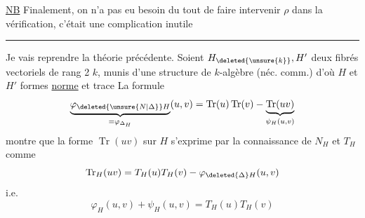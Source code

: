 \uline{NB} Finalement, on n'a pas eu besoin du tout de faire intervenir $\rho$ dans la vérification, c'était une complication inutile

\begin{center}\rule{3cm}{0.4pt}\end{center}

Je vais reprendre la théorie précédente. Soient $H_{\deleted{\unsure{k}}},H'$ deux fibrés vectoriels de rang 2  $k$, munis d'une  structure de $k$-algèbre (néc. comm.) d'où  $H$ et $H'$ formes \uline{norme} et trace
  La formule
\[
\underbrace{\varphi_{\deleted{\unsure{N|\Delta}}H}}_{=\varphi_{\Delta_H}}(u,v)=\operatorname{Tr}(u)\operatorname{Tr}(v)-\underbrace{\operatorname{Tr}(uv)}_{\psi_H(u,v)}
\]
montre que la forme $\operatorname{Tr}(uv)$ sur $H$ s'exprime par la connaissance de $N_H$ et $T_H$ comme
\[
\operatorname{Tr}_{H}(uv)=T_H(u)T_H(v)-\varphi_{\deleted{\Delta}H}(u,v)
\]
i.e.
\[
\varphi_H(u,v)+\psi_H(u,v)=T_H(u)T_H(v)
\]

